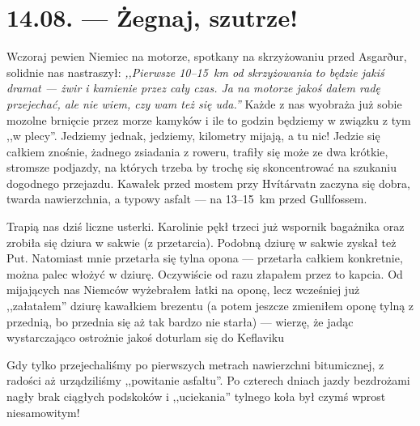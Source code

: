 \chapter*{14.08. --- Żegnaj, szutrze!}

Wczoraj pewien Niemiec na motorze, spotkany na skrzyżowaniu przed Asgarður, solidnie nas nastraszył: \emph{,,Pierwsze 10--15~km od skrzyżowania to będzie jakiś dramat --- żwir i kamienie przez cały czas. Ja na motorze jakoś dałem radę przejechać, ale nie wiem, czy wam też się uda.''} Każde z nas wyobraża już sobie mozolne brnięcie przez morze kamyków i ile to godzin będziemy w związku z tym ,,w plecy''. Jedziemy jednak, jedziemy, kilometry mijają, a tu nic! Jedzie się całkiem znośnie, żadnego zsiadania z roweru, trafiły się może ze dwa krótkie, stromsze podjazdy, na których trzeba by trochę się skoncentrować na szukaniu dogodnego przejazdu. Kawałek przed mostem przy Hvítárvatn zaczyna się dobra, twarda nawierzchnia, a typowy asfalt --- na 13--15~km przed Gullfossem.


Trapią nas dziś liczne usterki. Karolinie pękł trzeci już wspornik bagażnika oraz zrobiła się dziura w sakwie (z przetarcia). Podobną dziurę w sakwie zyskał też Put. Natomiast mnie przetarła się tylna opona --- przetarła całkiem konkretnie, można palec włożyć w dziurę. Oczywiście od razu złapałem przez to kapcia. Od mijających nas Niemców wyżebrałem łatki na oponę, lecz wcześniej już ,,załatałem'' dziurę kawałkiem brezentu (a potem jeszcze zmieniłem oponę tylną z przednią, bo przednia się aż tak bardzo nie starła) --- wierzę, że jadąc wystarczająco ostrożnie jakoś doturlam się do Keflaviku\textellipsis



\pagebreak

Gdy tylko przejechaliśmy po pierwszych metrach nawierzchni bitumicznej, z radości aż urządziliśmy ,,powitanie asfaltu''. Po czterech dniach jazdy bezdrożami nagły brak ciągłych podskoków i ,,uciekania'' tylnego koła był czymś wprost niesamowitym!

